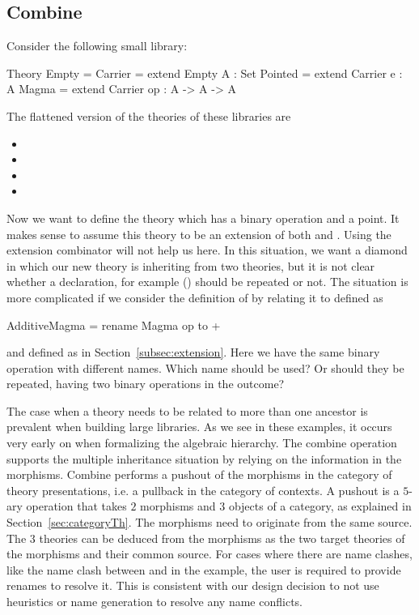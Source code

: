 \subsection{Combine}
\label{subsec:combine}
Consider the following small library: 
\begin{togcode} 
Theory Empty = {} 
Carrier = extend Empty {A : Set}
Pointed = extend Carrier {e : A}
Magma   = extend Carrier {op : A -> A -> A}
\end{togcode} 
The flattened version of the theories of these libraries are 
\begin{itemize}
\item[] 
\item[] 
\item[]  
\item[]  
\end{itemize}
Now we want to define the theory  which has a binary operation and a point. It makes sense to assume this theory to be an extension of both  and . Using the extension combinator will not help us here. In this situation, we want a diamond in which our new theory is inheriting from two theories, but it is not clear whether a declaration, for example () should be repeated or not. 
The situation is more complicated if we consider the definition of  by relating it to  defined as 
\begin{togcode} 
AdditiveMagma = rename Magma {op to +} 
\end{togcode} 
\noindent and  defined as in Section~\ref{subsec:extension}. Here we have the same binary operation with different names. Which name should be used? Or should they be repeated, having two  binary operations in the outcome? 

The case when a theory needs to be related to more than one ancestor is prevalent when building large libraries. As we see in these examples, it occurs very early on when formalizing the algebraic hierarchy. The combine operation supports the multiple inheritance situation by relying on the information in the morphisms. Combine performs a pushout of the morphisms in the category of theory presentations, i.e. a pullback in the category of contexts.  A pushout is a $5$-ary operation that takes $2$ morphisms and $3$ objects of a category, as explained in Section~\ref{sec:categoryTh}. The morphisms need to originate from the same source. The $3$ theories can be deduced from the morphisms as the two target theories of the morphisms and their common source. For cases where there are name clashes, like the name clash between  and \lstmath{+} in the  example, the user is required to provide renames to resolve it. This is consistent with our design decision to not use heuristics or name generation to resolve any name conflicts. 

